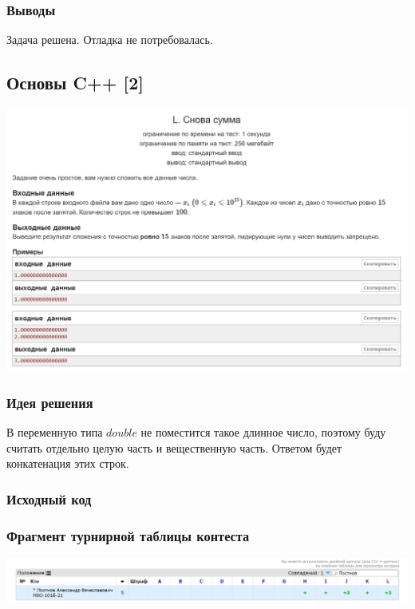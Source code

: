 \subsubsection*{Выводы}
Задача решена. Отладка не потребовалась.

\vspace{20pt}

\pagebreak
\subsection*{Основы C++ [2]}
\begin{center}
\includegraphics[width=\textwidth]{statements/2.png}
\end{center}
\subsubsection*{Идея решения}
В переменную типа $double$ не поместится такое длинное число, поэтому буду считать отдельно целую часть и вещественную часть. Ответом будет конкатенация этих строк.

\subsubsection*{Исходный код}


\subsubsection*{Фрагмент турнирной таблицы контеста}
\begin{center}
\includegraphics[width=\textwidth]{standings/2.png}\newline\noindent
\end{center}

